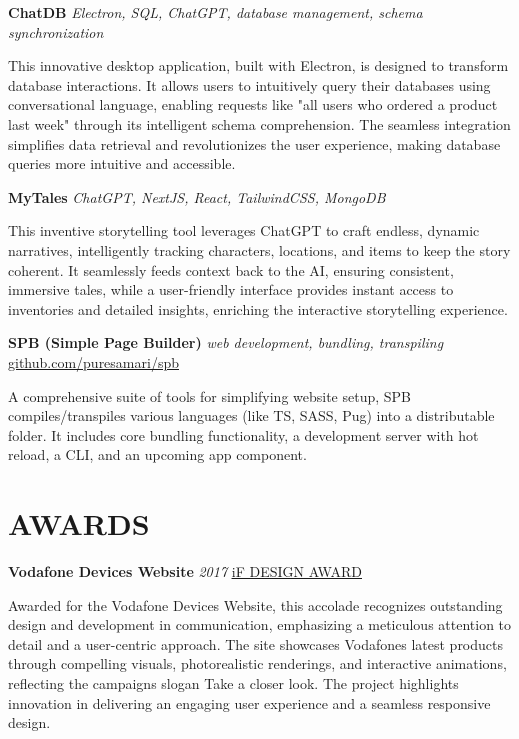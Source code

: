 \documentclass[fontsize=11pt]{article}
\newcommand{\link}[1]{{\color{blue}\underline{\href{#1}{#1}}}}
\newcommand{\maskedLink}[2]{{\color{blue}\underline{\href{#1}{#2}}}}
\newcommand{\sepspace}{\vspace*{1em}}   %
\newcommand{\NewPart}[1]{\section*{\uppercase{#1}}}
\newcommand{\EducationEntry}[4]{
    \noindent \textbf{#1} \hfill      %
    \colorbox{Black}{
      \parbox{8.5em}{
      \hfill\color{White}#2}} \par  %
    \noindent \textit{#3} \par        %
    \noindent\hangindent=2em\hangafter=0 \small #4 %
    \normalsize \par}
\newcommand{\ProjectEntry}[4]{         %
    \noindent \textbf{#1} \noindent \textit{#3} \hfill {#2} \par
    \noindent \small #4 %
    \normalsize \par}
\newcommand{\AwardEntry}[4]{         %
    \noindent \textbf{#1} \noindent \textit{#3} \hfill {#2} \par
    \noindent \small #4 %
    \normalsize \par}
\begin{document}
\sepspace

\ProjectEntry{ChatDB}{}
{Electron, SQL, ChatGPT, database management, schema synchronization}
{This innovative desktop application, built with Electron, is designed to transform database interactions. It allows users to intuitively query their databases using conversational language, enabling requests like "all users who ordered a product last week" through its intelligent schema comprehension. The seamless integration simplifies data retrieval and revolutionizes the user experience, making database queries more intuitive and accessible.}

\sepspace

\ProjectEntry{MyTales}{}
{ChatGPT, NextJS, React, TailwindCSS, MongoDB}
{This inventive storytelling tool leverages ChatGPT to craft endless, dynamic narratives, intelligently tracking characters, locations, and items to keep the story coherent. It seamlessly feeds context back to the AI, ensuring consistent, immersive tales, while a user-friendly interface provides instant access to inventories and detailed insights, enriching the interactive storytelling experience.}

\sepspace

\ProjectEntry{SPB (Simple Page Builder)}{\link{github.com/puresamari/spb}}
{web development, bundling, transpiling}
{A comprehensive suite of tools for simplifying website setup, SPB compiles/transpiles various languages (like TS, SASS, Pug) into a distributable folder. It includes core bundling functionality, a development server with hot reload, a CLI, and an upcoming app component.}

\NewPart{Awards}{}

\AwardEntry{Vodafone Devices Website}{\maskedLink{https://ifdesign.com/en/winner-ranking/project/vodafone-devices-website/208757}{iF DESIGN AWARD}}
{2017}
{Awarded for the Vodafone Devices Website, this accolade recognizes outstanding design and development in communication, emphasizing a meticulous attention to detail and a user-centric approach. The site showcases Vodafone\textquotesingle{}s latest products through compelling visuals, photorealistic renderings, and interactive animations, reflecting the campaign\textquotesingle{}s slogan \textquotesingle{}Take a closer look\textquotesingle{}. The project highlights innovation in delivering an engaging user experience and a seamless responsive design.}

\sepspace
\end{document}
